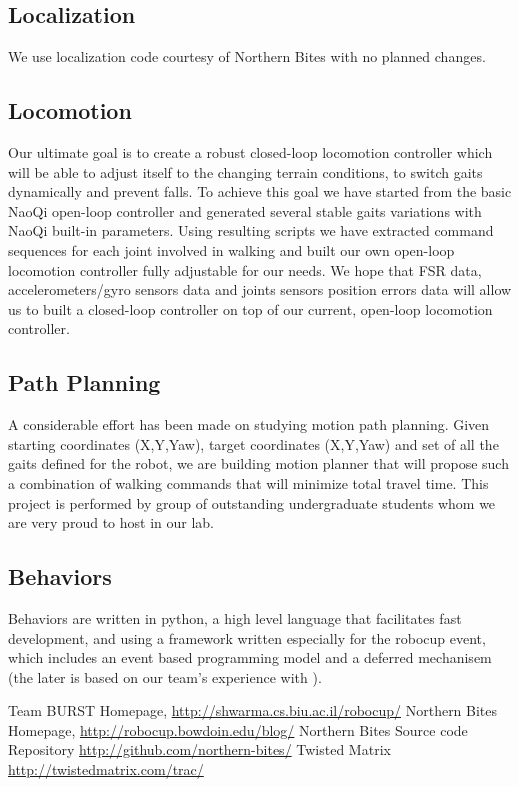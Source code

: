 \documentclass[runningheads,a4paper]{llncs}
\begin{document}
\subsection{Localization}
\label{localization}
We use localization code courtesy of Northern Bites \cite{northern,northern-repo} with no planned changes.

\subsection{Locomotion}
Our ultimate goal is to create a robust closed-loop locomotion controller which will be able to adjust itself to the changing terrain conditions, to switch gaits dynamically and prevent falls. To achieve this goal we have started from the basic NaoQi open-loop controller and generated several stable gaits variations with NaoQi built-in parameters. Using resulting scripts we have extracted command sequences for each joint involved in walking and built our own open-loop locomotion controller fully adjustable for our needs. We hope that FSR data, accelerometers/gyro sensors data and joints sensors position errors data will allow us to built a closed-loop controller on top of our current, open-loop locomotion controller.

\subsection{Path Planning}
A considerable effort has been made on studying motion path planning. Given starting coordinates (X,Y,Yaw), target coordinates (X,Y,Yaw) and set of all the gaits defined for the robot, we are building motion planner that will propose such a combination of walking commands that will minimize total travel time. This project is performed by group of outstanding undergraduate students whom we are very proud to host in our lab.

\subsection{Behaviors}
\label{behavior}
Behaviors are written in python, a high level language that facilitates fast development, and using a framework written especially for the robocup event, which includes an event based programming model and a deferred mechanisem (the later is based on our team's experience with \cite{twisted}).

\label{references}


\begin{thebibliography}{4}

 Team BURST Homepage, \url{http://shwarma.cs.biu.ac.il/robocup/}
 Northern Bites Homepage,
\url{http://robocup.bowdoin.edu/blog/}
 Northern Bites Source code Repository
\url{http://github.com/northern-bites/}
 Twisted Matrix
\url{http://twistedmatrix.com/trac/}
\end{thebibliography}
\end{document}
